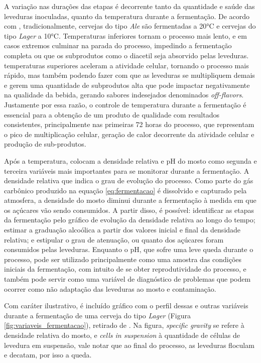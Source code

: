 A variação nas durações das etapas é decorrente tanto da quantidade e saúde das leveduras inoculadas, quanto da temperatura 
durante a fermentação. De acordo com , tradicionalmente, cervejas do tipo \textit{Ale} são fermentadas a 20°C e cervejas do tipo 
\textit{Lager} a 10°C. Temperaturas inferiores tornam o processo mais lento, e em casos extremos culminar na parada do processo, impedindo a fermentação completa ou que os subprodutos como o diacetil seja absorvido pelas leveduras. temperaturas superiores aceleram a atividade celular, tornando o processo mais rápido, mas também podendo fazer com que as leveduras se multipliquem demais e gerem uma quantidade de subprodutos alta que pode impactar negativamente na qualidade da bebida, gerando sabores indesejados denominados \textit{off-flavors}. 
Justamente por essa razão, o controle de temperatura durante a fermentação é essencial para a obtenção de um produto de 
qualidade com resultados consistentes, principalmente nas primeiras 72 horas do processo, que representam o pico de multiplicação celular, geração de calor decorrente da atividade celular e produção de sub-produtos.

Após a temperatura,  colocam a densidade relativa e pH do mosto como segunda e terceira
variáveis mais importantes para se monitorar durante a fermentação.
A densidade relativa que indica o grau de evolução do processo. Como parte do gás carbônico produzido 
na equação \ref{eq:fermentacao} é dissolvido e capturado pela atmosfera, a densidade do mosto diminui durante a 
fermentação à medida em que os açúcares vão sendo consumidos. A partir disso, é possível: identificar as etapas da 
fermentação pelo gráfico de evolução da densidade relativa ao longo do tempo; estimar a graduação alcoólica a partir dos 
valores inicial e final da densidade relativa; e estipular o grau de atenuação, ou quanto dos açúcares foram consumidos 
pelas leveduras.
Enquanto o pH, que sofre uma leve queda durante o processo, pode ser 
utilizado principalmente como uma amostra das condições iniciais da fermentação, com intuito de se obter reprodutividade do 
processo, e também pode servir como uma variável de diagnóstico de problemas que podem ocorrer como não adaptação das 
leveduras ao mosto e contaminação.

Com caráter ilustrativo, é incluído gráfico com o perfil dessas e outras variáveis durante a fermentação de uma cerveja 
do tipo \textit{Lager} (Figura \ref{fig:variaveis_fermentacao}), retirado de . Na figura, \textit{specific gravity} se refere à
densidade relativa do mosto, e \textit{cells in suspension} à quantidade de células de levedura em suspensão, vale notar que 
ao final do processo, as leveduras floculam e decatam, por isso a queda.

